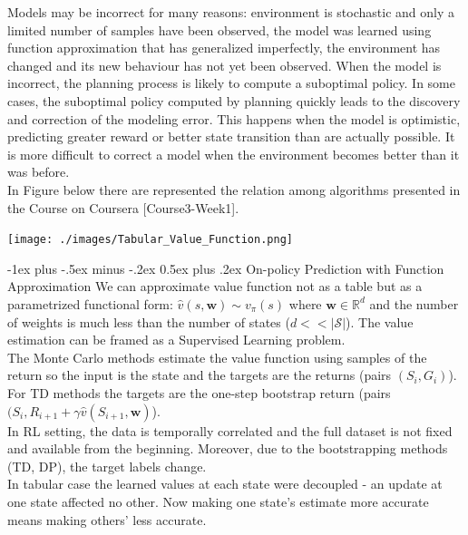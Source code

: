 \documentclass[10pt,landscape]{article}
\makeatletter
\renewcommand{\section}{\@startsection{section}{1}{0mm}%
                                {-1ex plus -.5ex minus -.2ex}%
                                {0.5ex plus .2ex}%
                                {\normalfont\large\bfseries}}
\makeatother
\begin{document}
\begin{multicols}{3}
Models may be incorrect for many reasons: environment is stochastic and only a limited number of samples have been observed, the model was learned using function approximation that has generalized imperfectly, the environment has changed and its new behaviour has not yet been observed. 
When the model is incorrect, the planning process is likely to compute a suboptimal policy. In some cases, the suboptimal policy computed by planning quickly leads to the discovery and correction of the modeling error. This happens when the model is optimistic, predicting greater reward or better state transition than are actually possible. It is more difficult to correct a model when the environment becomes better than it was before.\\
In Figure below there are represented the relation among algorithms presented in the Course on Coursera [Course3-Week1].\\
\begin{center}
\texttt{[image: ./images/Tabular\_Value\_Function.png]}
\end{center}



\section{On-policy Prediction with Function Approximation}
We can approximate value function not as a table but as a parametrized functional form: $\hat{v}(s,\mathbf{w}) \sim v_{\pi}(s)$ where $\mathbf{w} \in \mathbb{R}^d$ and the number of weights is much less than the number of states ($d << |\mathcal{S}|$).
The value estimation can be framed as a Supervised Learning problem.\\
The Monte Carlo methods estimate the value function using samples of the return so the input is the state and the targets are the returns (pairs $(S_i, G_i)$). \\
For TD methods the targets are the one-step bootstrap return (pairs $(S_i, R_{i+1} + \gamma \hat{v}(S_{i+1}, \mathbf{w})$).\\
In RL setting, the data is temporally correlated and the full dataset is not fixed and available from the beginning. Moreover, due to the bootstrapping methods (TD, DP), the target labels change.\\
In tabular case the learned values at each state were decoupled -  an update at one state affected no other.
Now making one state's estimate more accurate means making others' less accurate.


\end{multicols}
\end{document}
